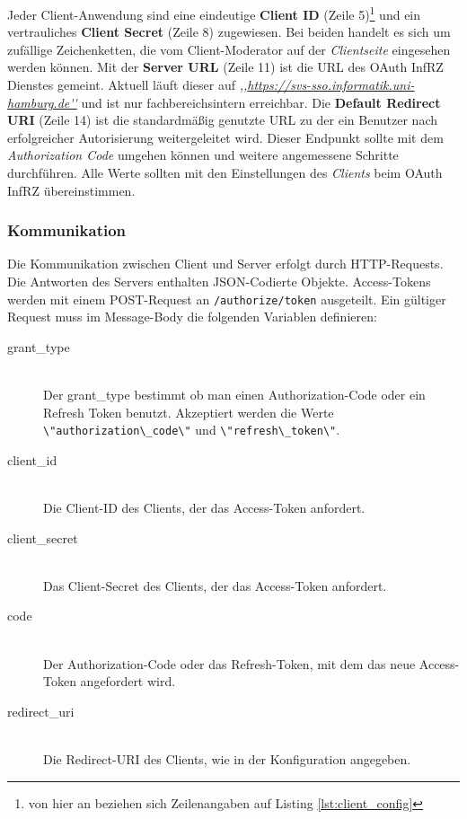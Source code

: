 \documentclass[12pt,a4paper,pointednumbers,abstracton]{scrartcl}
\newcommand{\code}[1]{\small\lstinline[style=InlinePHP]!#1!\normalsize}
\begin{document}
Jeder Client-Anwendung sind eine eindeutige \textbf{Client ID} (Zeile 5)\footnote{von hier an beziehen sich Zeilenangaben auf Listing \ref{lst:client_config}} und ein vertrauliches \textbf{Client Secret} (Zeile 8) zugewiesen.
Bei beiden handelt es sich um zufällige Zeichenketten, die vom Client-Moderator auf der \emph{Clientseite} eingesehen werden können.
Mit der \textbf{Server URL} (Zeile 11) ist die URL des OAuth InfRZ Dienstes gemeint.
Aktuell läuft dieser auf \emph{,,\url{https://svs-sso.informatik.uni-hamburg.de''}} und ist nur fachbereichsintern erreichbar.
Die \textbf{Default Redirect URI} (Zeile 14) ist die standardmäßig genutzte URL zu der ein Benutzer nach erfolgreicher Autorisierung weitergeleitet wird.
Dieser Endpunkt sollte mit dem \emph{Authorization Code} umgehen können und weitere angemessene Schritte durchführen.
Alle Werte sollten mit den Einstellungen des \emph{Clients} beim OAuth InfRZ übereinstimmen.

\subsubsection{Kommunikation}

Die Kommunikation zwischen Client und Server erfolgt durch HTTP-Requests.
Die Antworten des Servers enthalten JSON-Codierte Objekte.
Access-Tokens werden mit einem POST-Request an \code{/authorize/token} ausgeteilt.
Ein gültiger Request muss im Message-Body die folgenden Variablen definieren:

\begin{description}
	\item[grant\_type] \hfill \\
		Der grant\_type bestimmt ob man einen Authorization-Code oder ein Refresh Token benutzt.
		Akzeptiert werden die Werte \code{\"authorization\_code\"} und \code{\"refresh\_token\"}.
	\item[client\_id] \hfill \\
		Die Client-ID des Clients, der das Access-Token anfordert.
	\item[client\_secret] \hfill \\
		Das Client-Secret des Clients, der das Access-Token anfordert.
	\item[code] \hfill \\
		Der Authorization-Code oder das Refresh-Token, mit dem das neue Access-Token angefordert wird.
	\item[redirect\_uri] \hfill \\
		Die Redirect-URI des Clients, wie in der Konfiguration angegeben.
\end{description}
\end{document}
